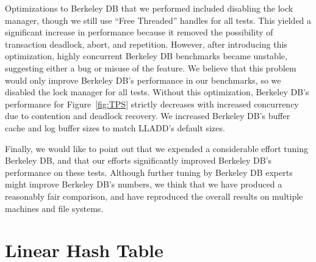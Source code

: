 \documentclass[10pt,letterpaper,twocolumn,english]{article}
\newcommand{\yad}{LLADD\xspace}
\begin{document}
Optimizations to Berkeley DB that we performed included disabling the
lock manager, though we still use ``Free Threaded'' handles for all
tests.  This yielded a significant increase in performance because it
removed the possibility of transaction deadlock, abort, and repetition.
However, after introducing this optimization, highly concurrent
Berkeley DB benchmarks became unstable, suggesting either a bug or
misuse of the feature.  We believe that this problem would only
improve Berkeley DB's performance in our benchmarks, so we disabled
the lock manager for all tests.  Without this optimization, Berkeley
DB's performance for Figure~\ref{fig:TPS} strictly decreases with increased concurrency due to contention and deadlock recovery.
We increased Berkeley DB's buffer cache and log buffer sizes to match
\yad's default sizes.

Finally, we would like to point out that we expended a considerable
effort tuning Berkeley DB, and that our efforts significantly improved
Berkeley DB's performance on these tests.  Although further tuning by
Berkeley DB experts might improve Berkeley DB's numbers, we think that
we have produced a reasonably fair comparison, and have reproduced the
overall results on multiple machines and file systems.


\section{Linear Hash Table\label{sub:Linear-Hash-Table}}



%
\end{document}
